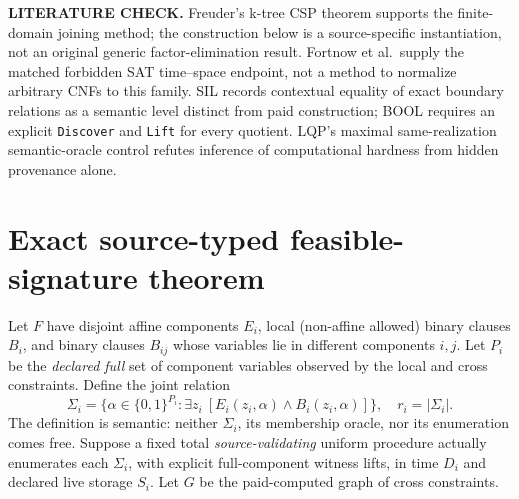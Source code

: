 \documentclass[11pt]{article}
\begin{document}
\noindent\textbf{LITERATURE CHECK.}
Freuder's k-tree CSP theorem supports the finite-domain joining method;
the construction below is a source-specific instantiation, not an
original generic factor-elimination result.
Fortnow et al.\ supply the matched forbidden SAT time--space
endpoint, not a method to normalize arbitrary CNFs to this family.
SIL records contextual equality of exact boundary relations as a semantic
level distinct from paid construction; BOOL requires an explicit
\texttt{Discover} and \texttt{Lift} for every quotient. LQP's maximal
same-realization semantic-oracle control refutes inference of computational
hardness from hidden provenance alone.

\section{Exact source-typed feasible-signature theorem}
Let \(F\) have disjoint affine components \(E_i\), local
(non-affine allowed) binary clauses \(B_i\), and binary clauses
\(B_{ij}\) whose variables lie in different components \(i,j\).
Let \(P_i\) be the \emph{declared full} set of component variables
observed by the local and cross constraints. Define the joint relation
\[
\Sigma_i=\bigl\{\alpha\in\{0,1\}^{P_i}:
 \exists z_i\ [E_i(z_i,\alpha)\wedge B_i(z_i,\alpha)]\bigr\},
\quad r_i=|\Sigma_i|.
\]
The definition is semantic: neither \(\Sigma_i\), its membership oracle,
nor its enumeration comes free. Suppose a fixed total
\emph{source-validating} uniform procedure actually enumerates each
\(\Sigma_i\), with explicit full-component witness lifts, in time \(D_i\)
and declared live storage \(S_i\). Let \(G\) be the paid-computed graph
of cross constraints.
\end{document}
